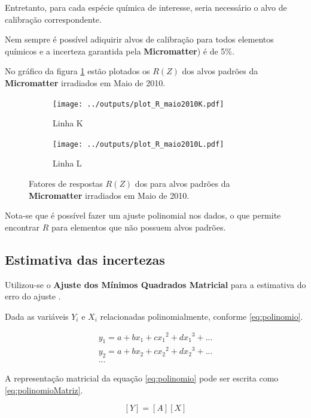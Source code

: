 Entretanto, para cada espécie química de interesse, seria necessário 
o alvo de calibração correspondente.

Nem sempre é possível adiquirir alvos de calibração para todos elementos
químicos e a incerteza garantida pela \textbf{Micromatter}) é de 5\%. 

No gráfico da figura \ref{fg:edxrfcalib} estão plotados os $R(Z)$ 
dos alvos padrões da \textbf{Micromatter} irradiados em Maio de 2010. 

\begin{figure}[H]
  \begin{subfigure}[b]{0.45\textwidth}
    \texttt{[image: ../outputs/plot\_R\_maio2010K.pdf]}
    \caption{Linha K}
  \end{subfigure}%
  \begin{subfigure}[b]{0.45\textwidth}
    \texttt{[image: ../outputs/plot\_R\_maio2010L.pdf]}
    \caption{Linha L}
  \end{subfigure}
  \caption{Fatores de respostas $R(Z)$ dos para alvos padrões da 
           \textbf{Micromatter} irradiados em Maio de 2010. 
           \label{fg:edxrfcalib}}
\end{figure}

Nota-se que é possível fazer um ajuste polinomial nos dados, o que 
permite encontrar $R$ para elementos que não possuem alvos padrões.

\subsection{Estimativa das incertezas}

Utilizou-se o \textbf{Ajuste dos Mínimos Quadrados Matricial} 
para a estimativa do erro do ajuste \citep{helene2006}.

Dada as variáveis $Y_i$ e $X_i$ relacionadas polinomialmente, 
conforme \ref{eq:polinomio}.

\begin{equation}
  \label{eq:polinomio}
  \begin{split}
    y_1 = a + b x_1 + c{x_1}^2 + d{x_1}^3 + ...\\
    y_2 = a + b x_2 + c{x_2}^2 + d{x_2}^3 + ... \\
    ...
  \end{split}
\end{equation}

A representação matricial da equação \ref{eq:polinomio} pode 
ser escrita como \ref{eq:polinomioMatriz}.

\begin{equation}
  \label{eq:polinomioMatriz}
  [Y] = [A][X]
\end{equation}

